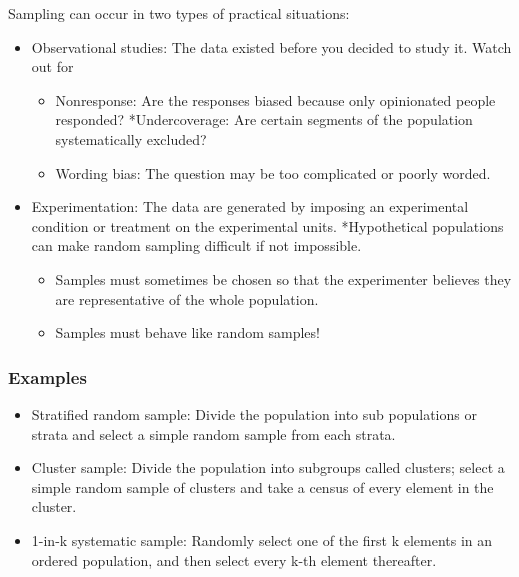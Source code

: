 \documentclass[]{article}
\begin{document}
Sampling can occur in two types of practical situations:

\begin{itemize}
\itemsep1pt\parskip0pt
\item
  Observational studies: The data existed before you decided to study
  it. Watch out for

  \begin{itemize}
  \itemsep1pt\parskip0pt
  \item
    Nonresponse: Are the responses biased because only opinionated
    people responded? *Undercoverage: Are certain segments of the
    population systematically excluded?
  \item
    Wording bias: The question may be too complicated or poorly worded.
  \end{itemize}
\item
  Experimentation: The data are generated by imposing an experimental
  condition or treatment on the experimental units. *Hypothetical
  populations can make random sampling difficult if not impossible.

  \begin{itemize}
  \itemsep1pt\parskip0pt
  \item
    Samples must sometimes be chosen so that the experimenter believes
    they are representative of the whole population.
  \item
    Samples must behave like random samples!
  \end{itemize}
\end{itemize}

\subsubsection{Examples}\label{examples}

\begin{itemize}
\itemsep1pt\parskip0pt
\item
  Stratified random sample: Divide the population into sub populations
  or strata and select a simple random sample from each strata.
\item
  Cluster sample: Divide the population into subgroups called clusters;
  select a simple random sample of clusters and take a census of every
  element in the cluster.
\item
  1-in-k systematic sample: Randomly select one of the first k elements
  in an ordered population, and then select every k-th element
  thereafter.
\end{itemize}
\end{document}
